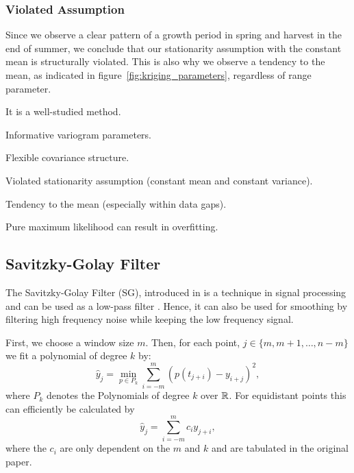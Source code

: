 		\subsubsection*{Violated Assumption}
			Since we observe a clear pattern of a growth period in spring and harvest in the end of summer, we conclude that our stationarity assumption with the constant mean is structurally violated. This is also why we observe a tendency to the mean, as indicated in figure~\ref{fig:kriging_parameters}, regardless of range parameter.

		\begin{my_pros_cons_table}{
				\item It is a well-studied method.
				\item Informative variogram parameters.
				\item Flexible covariance structure.
			}{
				\item Violated stationarity assumption (constant mean and constant variance). 
				\item Tendency to the mean (especially within data gaps).
				\item Pure maximum likelihood can result in overfitting.
			}
		\end{my_pros_cons_table}


	\subsection{Savitzky-Golay Filter}
		\label{sec:Savitzky-Golay}
		The Savitzky-Golay Filter (SG), introduced in \cite{savitzkySmoothingDifferentiationData1964} is a technique in signal processing and can be used as a low-pass filter  \citep{schaferWhatSavitzkyGolayFilter2011}. Hence, it can also be used for smoothing by filtering high frequency noise while keeping the low frequency signal.

		First, we choose a window size $m$. Then, for each point, $j \in \{m, m+1, \dots, n-m\}$ we fit a polynomial of degree $k$ by:
		$$\hat y_j=\min_{p\in P_k}\sum_{i=-m}^{m}(p (t_{j+i})-y_{i+j})^{2},$$
		where $P_k$ denotes the Polynomials of degree $k$ over $\mathbb{R}$.
		For equidistant points this can efficiently be calculated by
		$$
			\hat y_{j}=\sum_{i=-m}^{m} c_{i} y_{j+i},
		$$
		where the $c_i$ are only dependent on the $m$ and $k$ and are tabulated in the original paper.

